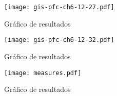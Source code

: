 \documentclass[a4paper,12pt]				{article}
\begin{document}
\begin{figure}
	\begin{center}
		\texttt{[image: gis-pfc-ch6-12-27.pdf]}
	\end{center}
	\caption{Gráfico de resultados}
	\label{fig:gis-pfc-ch6-12-27}
\end{figure}

\begin{figure}
	\begin{center}
		\texttt{[image: gis-pfc-ch6-12-32.pdf]}
	\end{center}
	\caption{Gráfico de resultados}
	\label{fig:gis-pfc-ch6-12-32}
\end{figure}

\begin{figure}
	\begin{center}
		\texttt{[image: measures.pdf]}
	\end{center}
	\caption{Gráfico de resultados}
	\label{fig:measures}
\end{figure}
\end{document}
